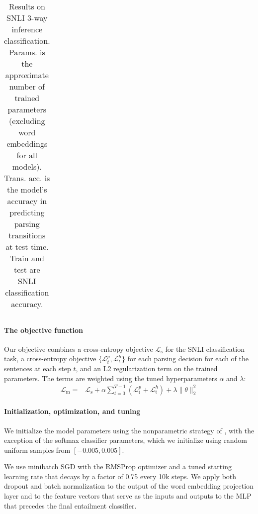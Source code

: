 \documentclass[11pt]{article}
\providecommand{\norm}[1]{\lVert#1\rVert}
\begin{document}
\begin{table*}[t]
\begin{tabular}{lrrrr}
    \bottomrule
  \end{tabular}
\caption{\protect\label{tab:results}Results on SNLI 3-way inference classification. Params. is the approximate number of trained parameters (excluding word embeddings for all models). Trans. acc. is the model's accuracy in predicting parsing transitions at test time. Train and test are SNLI classification accuracy.}
\end{table*}


\paragraph{The objective function} Our objective combines a cross-entropy objective $\mathcal{L}_{\text{s}}$ for the SNLI classification task, a cross-entropy objective $\{\mathcal{L}_t^p, \mathcal{L}_t^h\}$ for each parsing decision for each of the sentences at each step $t$, and an L2 regularization term on the trained parameters. The terms are weighted using the tuned hyperparameters $\alpha$ and $\lambda$:
\begin{equation}
\begin{split}
\mathcal{L}_{\text{m}} = &\mathcal{L}_{\text{s}} + \alpha \sum_{t=0}^{T-1} (\mathcal{L}_{\text{t}}^{p} + \mathcal{L}_{\text{t}}^{h}) + \lambda \norm{\theta}^2_2
\end{split}
\end{equation}

\paragraph{Initialization, optimization, and tuning}

We initialize the model parameters using the nonparametric strategy of \citet{DBLP:journals/corr/HeZR015}, with the exception of the softmax classifier parameters, which we initialize using random uniform samples from $[-0.005, 0.005]$.

We use minibatch SGD with the RMSProp optimizer \citep{tieleman2012lecture} and a tuned starting learning rate that decays by a factor of 0.75 every 10k steps. We apply both dropout \citep{srivastava2014dropout} and batch normalization \citep{2015SIoffeCSzegedy} to the output of the word embedding projection layer and to the feature vectors that serve as the inputs and outputs to the MLP that precedes the final entailment classifier.
\end{document}
